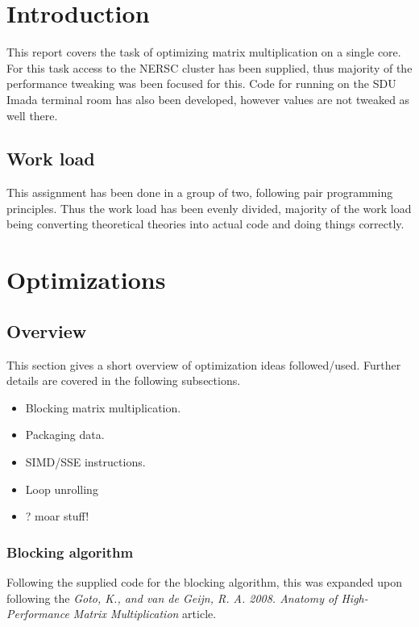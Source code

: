 \documentclass[a4paper,11pt,oneside]{book}
\begin{document}
\renewcommand{\contentsname}{Table of Contents}
\tableofcontents
\thispagestyle{empty}

\pagestyle{ruled}
\chapter{Introduction}
\setcounter{section}{1}
This report covers the task of optimizing matrix multiplication on a single core. For this task access to the NERSC cluster has been supplied, thus majority of the performance tweaking was been focused for this. Code for running on the SDU Imada terminal room has also been developed, however values are not tweaked as well there.

\section{Work load}
This assignment has been done in a group of two, following pair programming principles. Thus the work load has been evenly divided, majority of the work load being converting theoretical theories into actual code and doing things correctly.


\chapter{Optimizations}
\section{Overview}
This section gives a short overview of optimization ideas followed/used. Further details are covered in the following subsections.

\begin{itemize}
\item Blocking matrix multiplication.
\item Packaging data.
\item SIMD/SSE instructions.
\item Loop unrolling
\item ? moar stuff! %
\end{itemize}

\subsection{Blocking algorithm}
Following the supplied code for the blocking algorithm, this was expanded upon following the \emph{Goto, K., and van de Geijn, R. A. 2008. Anatomy of High-Performance Matrix Multiplication} article.
\end{document}
